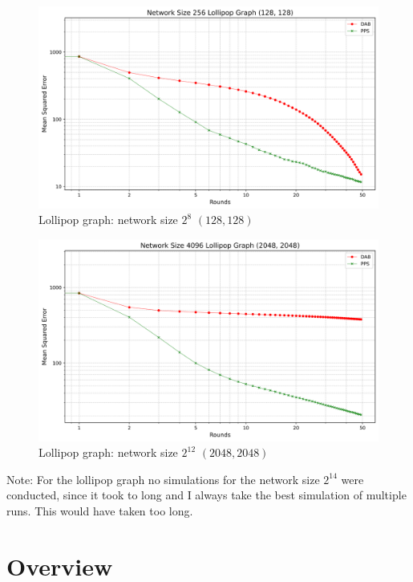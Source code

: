 \begin{figure}[H]
    \centering
    \includegraphics[scale=0.5]{figures/lollipopGraphSimulations/DAB_vs_PPS_LG_r50_n256.png}
    \caption{Lollipop graph: network size $2^{8}$ $(128, 128)$}
    \label{fig:128+128lollipop}
\end{figure}

\begin{figure}[H]
    \centering
    \includegraphics[scale=0.5]{figures/lollipopGraphSimulations/DAB_vs_PPS_LG_r50_n4096.png}
    \caption{Lollipop graph: network size $2^{12}$ $(2048, 2048)$}
    \label{fig:2048+2048lollipop}
\end{figure}

Note: For the lollipop graph no simulations for the network size $2^{14}$ were conducted, since it took to long and I always take the best simulation of multiple runs. This would have taken too long.

\section{Overview}